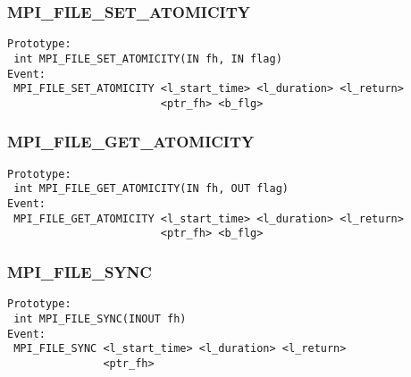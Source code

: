 \documentclass[9pt]{article}
\begin{document}
\subsubsection{MPI\_FILE\_SET\_ATOMICITY}
\label{sec:MPIFILESETATOMICITY}
\begin{verbatim}
Prototype:
 int MPI_FILE_SET_ATOMICITY(IN fh, IN flag)
Event:
 MPI_FILE_SET_ATOMICITY <l_start_time> <l_duration> <l_return>
                        <ptr_fh> <b_flg>
\end{verbatim}

\subsubsection{MPI\_FILE\_GET\_ATOMICITY}
\label{sec:MPIFILEGETATOMICITY}
\begin{verbatim}
Prototype:
 int MPI_FILE_GET_ATOMICITY(IN fh, OUT flag)
Event:
 MPI_FILE_GET_ATOMICITY <l_start_time> <l_duration> <l_return>
                        <ptr_fh> <b_flg>
\end{verbatim}

\subsubsection{MPI\_FILE\_SYNC}
\label{sec:MPIFILESYNC}
\begin{verbatim}
Prototype:
 int MPI_FILE_SYNC(INOUT fh)
Event:
 MPI_FILE_SYNC <l_start_time> <l_duration> <l_return>
               <ptr_fh>
\end{verbatim}
\end{document}
